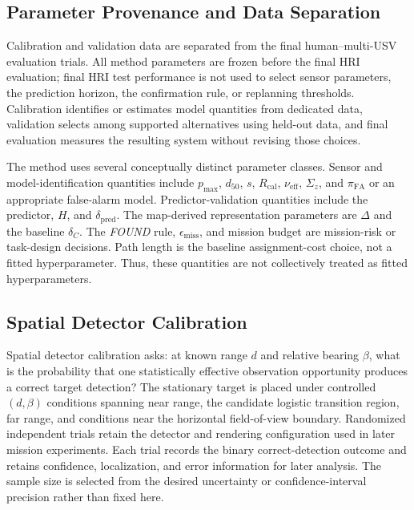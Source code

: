 \documentclass[letterpaper, 10pt, conference]{ieeeconf}
\begin{document}
\subsection{Parameter Provenance and Data Separation}


Calibration and validation data are separated from the final human--multi-USV evaluation trials. All method parameters are frozen before the final HRI evaluation; final HRI test performance is not used to select sensor parameters, the prediction horizon, the confirmation rule, or replanning thresholds. Calibration identifies or estimates model quantities from dedicated data, validation selects among supported alternatives using held-out data, and final evaluation measures the resulting system without revising those choices.

The method uses several conceptually distinct parameter classes. Sensor and model-identification quantities include \(p_{\max}\), \(d_{50}\), \(s\), \(R_{\mathrm{cal}}\), \(\nu_{\mathrm{eff}}\), \(\Sigma_z\), and \(\pi_{\mathrm{FA}}\) or an appropriate false-alarm model. Predictor-validation quantities include the predictor, \(H\), and \(\delta_{\mathrm{pred}}\). The map-derived representation parameters are \(\Delta\) and the baseline \(\delta_C\). The \emph{FOUND} rule, \(\epsilon_{\mathrm{miss}}\), and mission budget are mission-risk or task-design decisions. Path length is the baseline assignment-cost choice, not a fitted hyperparameter. Thus, these quantities are not collectively treated as fitted hyperparameters.

\subsection{Spatial Detector Calibration}


Spatial detector calibration asks: at known range \(d\) and relative bearing \(\beta\), what is the probability that one statistically effective observation opportunity produces a correct target detection? The stationary target is placed under controlled \((d,\beta)\) conditions spanning near range, the candidate logistic transition region, far range, and conditions near the horizontal field-of-view boundary. Randomized independent trials retain the detector and rendering configuration used in later mission experiments. Each trial records the binary correct-detection outcome and retains confidence, localization, and error information for later analysis. The sample size is selected from the desired uncertainty or confidence-interval precision rather than fixed here.
\end{document}
